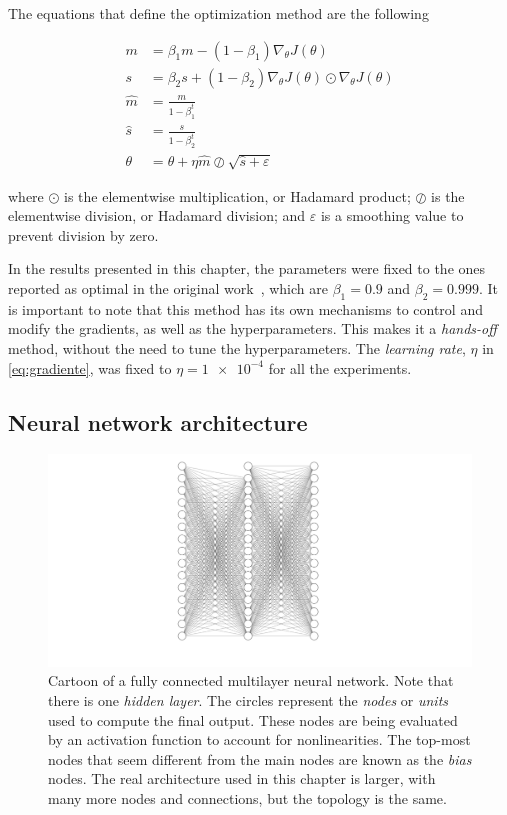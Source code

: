 The equations that define the optimization method are the following

\begin{align}
    m &= \beta_1 m - (1 - \beta_1) \nabla_{\theta} J(\theta) \nonumber \\
    s &= \beta_2 s + (1 - \beta_2) \nabla_{\theta} J(\theta) \odot \nabla_{\theta} J(\theta) \nonumber \\
    \hat{m} &= \frac{m}{1 - \beta_1^t} \nonumber \\
    \hat{s} &= \frac{s}{1 - \beta_2^t} \nonumber \\
    \theta &= \theta + \eta \hat{m} \oslash \sqrt{\hat{s} + \varepsilon}
    \label{eq:adam}
\end{align}

where $\odot$ is the elementwise multiplication, or Hadamard product; $\oslash$
is the elementwise division, or Hadamard division; and $\varepsilon$ is a smoothing
value to prevent division by zero.

In the results presented in this chapter, the parameters were fixed to the ones reported
as optimal in the original work~\cite{kingmaAdamMethodStochastic2017}, which are
$\beta_1=\num{0.9}$ and $\beta_2=\num{0.999}$. It is important to note that this method
has its own mechanisms to control and modify the gradients, as well as the hyperparameters.
This makes it a \emph{hands-off} method, without the need to tune the hyperparameters.
The \emph{learning rate}, $\eta$ in \autoref{eq:gradiente}, was fixed to
$\eta=\num{1e-4}$ for all the experiments.

\subsection{Neural network architecture}

\begin{figure}[t]
    \includegraphics[width=\textwidth]{figuras/capitulo-3/neural-network.pdf}
    \vspace{-1.5cm}
    \caption[General schematics of a neural network.]{Cartoon of a fully connected multilayer neural network. Note that there is one \emph{hidden layer}. The circles represent the \emph{nodes} or \emph{units} used to compute the final output. These nodes are being evaluated by an activation function to account for nonlinearities. The top-most nodes that seem different from the main nodes are known as the \emph{bias} nodes. The real architecture used in this chapter is larger, with many more nodes and connections, but the topology is the same.}
    \label{fig:nn-esquema}
\end{figure}


